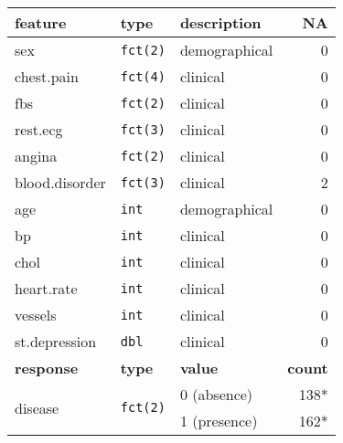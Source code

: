 \begin{tabular}{lllr}
    \toprule
    \textbf{feature} 
        & \textbf{type}
        & \textbf{description}
        & \textbf{NA}
        \\
    \midrule
    sex 
        & \texttt{fct(2)}
        & demographical
        & 0
        \\ 
    \midrule
    chest.pain 
        & \texttt{fct(4)}
        & clinical
        & 0
        \\
    \midrule
    fbs 
        & \texttt{fct(2)}
        & clinical
        & 0
        \\
    \midrule
    rest.ecg 
        & \texttt{fct(3)}
        & clinical
        & 0
        \\
    \midrule
    angina 
        & \texttt{fct(2)}
        & clinical
        & 0
        \\
    \midrule
    blood.disorder 
        & \texttt{fct(3)}
        & clinical
        & {\color{red} 2}
        \\
    \midrule
    age 
        & \texttt{int}
        & demographical
        & 0
        \\
    \midrule
    bp 
        & \texttt{int}
        & clinical
        & 0
        \\
    \midrule
    chol 
        & \texttt{int}
        & clinical
        & 0
        \\
    \midrule
    heart.rate 
        & \texttt{int}
        & clinical
        & 0
        \\
    \midrule
    vessels 
        & \texttt{int}
        & clinical
        & 0

        \\
    \midrule
    st.depression 
        & \texttt{dbl}
        & clinical
        & 0
        \\
    \bottomrule
    \toprule
    \textbf{response} 
        & \textbf{type}
        & \textbf{value}
        & \textbf{count}
        \\
    \midrule
    \multirow{2}{*}{disease}
        & \multirow{2}{*}{\texttt{fct(2)}}
        & 0 (absence) & 138*
        \\
        && 1 (presence) & 162*
        \\
    \bottomrule
\end{tabular}